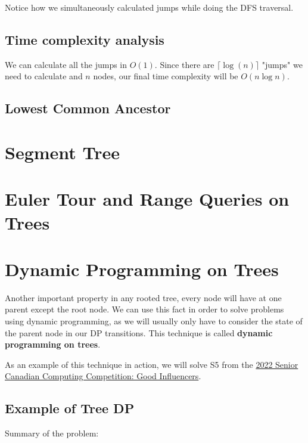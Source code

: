 \documentclass{article}
\begin{document}
Notice how we simultaneously calculated jumps while doing the DFS traversal.

\subsection{Time complexity analysis}
We can calculate all the jumps in $O(1)$. Since there are $\lceil \log (n) \rceil$ "jumps" we need to calculate and $n$ nodes, our final time complexity will be $O(n \log n)$.


\subsection{Lowest Common Ancestor}



\section{Segment Tree}

\section{Euler Tour and Range Queries on Trees}

\section{Dynamic Programming on Trees}
Another important property in any rooted tree, every node will have at one parent except the root node. We can use this fact in order to solve problems using dynamic programming, as we will usually only have to consider the state of the parent node in our DP transitions. This technique is called \textbf{dynamic programming on trees}.

As an example of this technique in action, we will solve S5 from the \href{https://dmoj.ca/problem/ccc22s5}{2022 Senior Canadian Computing Competition: Good Influencers}.

\subsection{Example of Tree DP}
Summary of the problem: 
\end{document}
